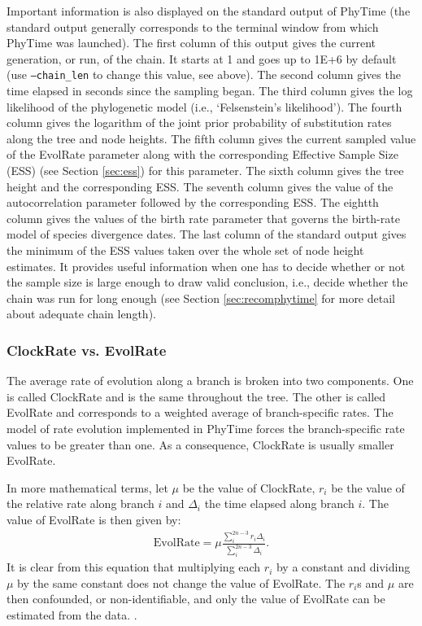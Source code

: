 \documentclass[a4paper,12pt]{article}
\newcommand{\x}[1]{\texttt{#1}}
\begin{document}
Important  information is also  displayed on  the standard  output of  PhyTime (the  standard output
generally corresponds to the terminal window from  which PhyTime was launched).  The first column of
this output gives the current  generation, or run, of the chain. It starts at  1 and goes up to 1E+6
by default (use \x{--chain\_len} to change this value, see above).  The second column gives the time
elapsed  in seconds since  the sampling  began. The  third column  gives the  log likelihood  of the
phylogenetic model (i.e., `Felsenstein's likelihood'). The  fourth column gives the logarithm of the
joint prior  probability of substitution  rates along  the tree and  node heights. The  fifth column
gives the  current sampled value  of the EvolRate  parameter along with the  corresponding Effective
Sample Size (ESS) (see  Section \ref{sec:ess}) for this parameter.  The sixth  column gives the tree
height  and the  corresponding  ESS.  The seventh  column  gives the  value  of the  autocorrelation
parameter followed by the  corresponding ESS. The eightth column gives the  values of the birth rate
parameter that  governs the birth-rate model  of species divergence  dates.  The last column  of the
standard  output gives  the minimum  of the  ESS  values taken  over the  whole set  of node  height
estimates.  It provides useful information when one has  to decide whether or not the sample size is
large enough to draw  valid conclusion, i.e., decide whether the chain was  run for long enough (see
Section \ref{sec:recomphytime} for more detail about adequate chain length).

\subsubsection{ClockRate vs. EvolRate}

The average rate of evolution along a branch  is broken into two components. One is called ClockRate
and is  the same throughout  the tree. The  other is called EvolRate  and corresponds to  a weighted
average of  branch-specific rates.  The  model of rate  evolution implemented in PhyTime  forces the
branch-specific rate values to  be greater than one. As a consequence,  ClockRate is usually smaller
EvolRate.

In more mathematical terms, let $\mu$ be the value of ClockRate, $r_i$ be the value of the relative
rate along branch $i$ and $\Delta_i$ the time elapsed along branch $i$. The value of EvolRate is
then given by:
\begin{eqnarray*}
\mathrm{EvolRate} = \mu \frac{\sum_{i}^{2n-3} r_i \Delta_i}{\sum_{i}^{2n-3} \Delta_i}.
\end{eqnarray*}  It is  clear from  this equation  that  multiplying each  $r_i$ by  a constant  and
dividing $\mu$ by the same constant does not  change the value of EvolRate. The $r_i$s and $\mu$
are then confounded,  or non-identifiable, and only  the value of EvolRate can  be estimated from
the data.   {\color{red}{Please make sure  that you use  the value of  EvolRate rather than  that of
ClockRate when referring to the estimate of the substitution rate}}.
\end{document}
